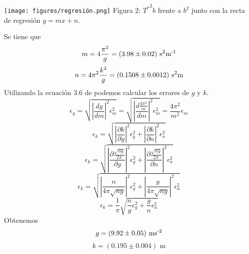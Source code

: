 \documentclass{article}
\begin{document}
\begin{multicols}{2}
\begin{center}
\texttt{[image: figures/regresión.png]}
Figura 2: ${T^*}^2b$ frente a $b^2$ junto con la recta de regresión $y=mx+n$.
\end{center}
Se tiene que
$$
m = 4\frac{\pi^2}{g} = (3.98 \pm 0.02) \text{ s\textsuperscript{2}m\textsuperscript{-1}}
$$
$$
n = 4 \pi^2 \frac{k^2}{g} = (0.1508 \pm 0.0012) \text{ s\textsuperscript{2}m}
$$
Utilizando la ecuación 3.6 de \cite{manual} podemos calcular los errores de $g$ y $k$.
$$
\epsilon_g =
\sqrt{ \left| \frac{dg}{dm} \right|^2 \epsilon_m^2 } =
\sqrt{ \left| \frac{d \frac{4\pi^2}{m}}{dm} \right|^2 \epsilon_m^2 } =
\frac{4\pi^2}{m^2}\epsilon_m
$$
$$
\epsilon_k =
\sqrt{
  \left| \frac{\partial k}{\partial g} \right|^2 \epsilon_g^2 +
  \left| \frac{\partial k}{\partial n} \right|^2 \epsilon_n^2
}
$$
$$
\epsilon_k = \sqrt{
  \left| \frac{\partial \frac{\sqrt{ng}}{2\pi}}{\partial g} \right|^2 \epsilon_g^2 +
  \left| \frac{\partial \frac{\sqrt{ng}}{2\pi}}{\partial n} \right|^2 \epsilon_n^2
}
$$
$$
\epsilon_k = \sqrt{
  \left| \frac{n}{4\pi\sqrt{ng}} \right|^2 \epsilon_g^2 +
  \left| \frac{g}{4\pi\sqrt{ng}} \right|^2 \epsilon_n^2
}
$$
$$
\epsilon_k =
\frac{1}{\pi} \sqrt{\frac{n}{g} \epsilon_g^2 + \frac{g}{n} \epsilon_n^2}
$$
Obtenemos
$$
g = (9.92 \pm 0.05) \text{ ms\textsuperscript{-2}}
$$
$$
k = (0.195 \pm 0.004) \text{ m}
$$

\end{multicols}
\end{document}
